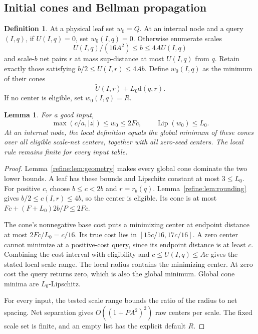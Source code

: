 \documentclass[11pt]{article}
\newtheorem{lemma}[theorem]{Lemma}
\theoremstyle{definition}
\newtheorem{definition}[theorem]{Definition}
\newcommand{\Lip}{\operatorname{Lip}}
\newcommand{\dd}{\mathrm d}
\newcommand{\1}{\mathbf 1}
\begin{document}
\subsection{Initial cones and Bellman propagation}

\begin{definition}\label{refine:def:cones}
At a physical leaf set $w_0=Q$. At an internal node and a query $(I,q)$,
if $U(I,q)=0$, set $w_0(I,q)=0$. Otherwise enumerate scales
\[
 U(I,q)/(16A^2)\le b\le4AU(I,q)
\]
and scale-$b$ net pairs $r$ at mass sup-distance at most $U(I,q)$
from $q$. Retain exactly those satisfying
$b/2\le U(I,r)\le4Ab$. Define $w_0(I,q)$ as the minimum of their
cones
\[
 \widetilde U(I,r)+L_0\dd(q,r).
\]
If no center is eligible, set $w_0(I,q)=R$.
\end{definition}

\begin{lemma}\label{refine:lem:cones}
For a good input,
\[
 \max(c/a,|z|)\le w_0\le2Fc,\qquad\Lip(w_0)\le L_0.
\]
At an internal node, the local definition equals the global minimum of
these cones over all eligible scale-net centers, together with all
zero-seed centers. The local rule remains finite for every input table.
\end{lemma}
\begin{proof}
Lemma~\ref{refine:lem:geometry} makes every global cone dominate the two
lower bounds. A leaf has these bounds and Lipschitz constant at most
$3\le L_0$. For positive $c$, choose $b\le c<2b$ and $r=r_b(q)$.
Lemma~\ref{refine:lem:rounding} gives
$b/2\le c(I,r)\le4b$, so the center is eligible. Its cone is at most
$Fc+(F+L_0)2b/P\le2Fc$.

The cone's nonnegative base cost puts a minimizing center at endpoint distance at most
$2Fc/L_0=c/16$. Its true cost lies in $[15c/16,17c/16]$.
A zero center cannot minimize at a positive-cost query, since its
endpoint distance is at least $c$. Combining the cost interval with
eligibility and $c\le U(I,q)\le Ac$ gives the stated local scale range.
The local radius contains the minimizing center. At zero cost the
query returns zero, which is also the global minimum. Global cone
minima are $L_0$-Lipschitz.

For every input, the tested scale range bounds the ratio of the radius
to net spacing. Net separation gives $O((1+PA^2)^2)$ raw centers per
scale. The fixed scale set is finite, and an empty list has the explicit
default $R$.
\end{proof}
\end{document}
